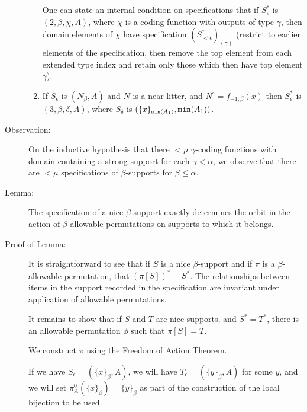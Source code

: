 \documentclass[112pt]{article}
\begin{document}
\begin{description}
\begin{enumerate}
One can state an internal condition on specifications that if $S^*_\epsilon$ is $(2,\beta,\chi,A)$, where $\chi$ is a coding function with outputs of type
$\gamma$, then domain elements of $\chi$ have specification $(S^*_{<\epsilon})_{(\gamma)}$ (restrict to earlier elements of the specification, then remove the top element from each extended type index and retain only those which then have top element $\gamma$).

\item  If $S_\epsilon$ is $(N_\beta,A)$ and $N$ is a near-litter, and $N^\circ=f_{-1,\beta}(x)$  then $S^*_\epsilon$ is $(3,\beta,\delta,A)$, where  $S_\delta$ is $(\{x\}_{{\tt min}(A_1)},{\tt min}(A_1))$.

\end{enumerate}

\begin{comment}

Peter wants a definition of the type specification independent of the type support.  Use tags.   It's a good idea.

\end{comment}

\item[Observation:]  On the inductive hypothesis that there $<\mu$ $\gamma$-coding functions with domain containing a strong support  for each $\gamma<\alpha$, we observe that there are $<\mu$ specifications of $\beta$-supports for $\beta\leq \alpha$.

\item[Lemma:]  The specification of a nice $\beta$-support exactly determines the orbit in the action of $\beta$-allowable permutations on supports to which it belongs.

\item[Proof of Lemma:]

It is straightforward to see that if $S$ is a nice $\beta$-support and if $\pi$ is a $\beta$-allowable permutation, that $(\pi[S])^* = S^*$.  The relationships between items in the support recorded in the specification are invariant under application of allowable permutations.

It remains to show that if $S$ and $T$ are nice supports, and $S^*=T^*$, there is an allowable permutation $\phi$ such that $\pi[S]=T$.

We construct $\pi$ using the Freedom of Action Theorem.

If we have $S_\epsilon = (\{x\}_\beta,A)$, we will have $T_\epsilon = (\{y\}_\beta,A)$ for some $y$, and we will set $\pi^0_A(\{x\}_\beta) = \{y\}_\beta$ as part of the construction of the local bijection to be used.


\end{description}
\end{document}
